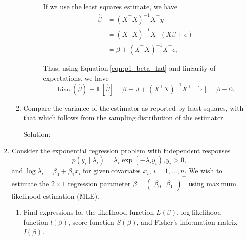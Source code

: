 \documentclass[letterpaper,11pt]{article}
\begin{document}
\begin{enumerate}
\begin{enumerate}
\begin{description}
      If we use the least squares estimate, we have
      \begin{align}
        \hat{\beta}
        &= \left(X^\intercal X\right)^{-1}X^\intercal y \nonumber\\
        &= \left(X^\intercal X\right)^{-1}X^\intercal\left(X\beta + \epsilon \right) \nonumber\\
        &= \beta + \left(X^\intercal X\right)^{-1}X^\intercal\epsilon,
          \label{eqn:p1_beta_hat}
      \end{align}

      Thus, using Equation \ref{eqn:p1_beta_hat} and linearity of expectations,
      we have
      \begin{equation}
        \boxed{
          \operatorname{bias}\left(\hat{\beta}\right) =
          \mathbb{E}\left[\hat{\beta}\right] - \beta =
          \beta +
          \left(X^\intercal X\right)^{-1}X^\intercal
          \mathbb{E}\left[\epsilon\right] - \beta
          = 0.
        }
        \label{eqn:p1_beta_hat_bias}
      \end{equation}
    \end{description}
  \item Compare the variance of the estimator as reported by least squares, with
    that which follows from the sampling distribution of the estimator.

    \begin{description}
    \item[Solution:] 
    \end{description}
  \end{enumerate}
\item Consider the exponential regression problem with independent responses
  \begin{equation}
    p\left(y_i \mid \lambda_i\right) = \lambda_i\exp\left(-\lambda_iy_i\right),
    y_i > 0,
    \label{eqn:p2_model}
  \end{equation}
  and $\log\lambda_i = \beta_0 + \beta_1x_i$ for given covariates $x_i$,
  $i = 1,\ldots,n$. We wish to estimate the $2 \times 1$ regression parameter
  $\beta = \begin{pmatrix}
    \beta_0 & \beta_1
  \end{pmatrix}^\intercal$ using maximum likelihood estimation (MLE).

  \begin{enumerate}
  \item Find expressions for the likelihood function $L\left(\beta\right)$,
    log-likelihood function $l\left(\beta\right)$, score function
    $S\left(\beta\right)$, and Fisher's information matrix $I\left(\beta\right)$.


\end{enumerate}
\end{enumerate}
\end{document}
